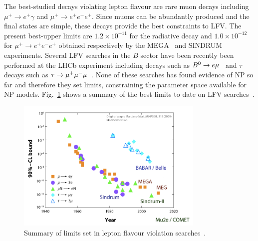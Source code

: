 The best-studied decays violating lepton flavour 
are rare muon decays including $\mu^+\to e^+\gamma$ and $\mu^+\to e^+e^-e^+$.
Since muons can be abundantly produced and the final states are simple,
these decays provide the best constraints to LFV. The present best-upper limits are $1.2 \times 10^{-11}$
for the radiative decay and $1.0 \times 10^{-12}$ for $\mu^+\to e^+e^-e^+$ obtained
respectively by the MEGA~\cite{Ahmed:2001eh} and SINDRUM~\cite{Bellgardt:1987du} experiments.
Several LFV searches in the $B$ sector have been recently been performed at the LHCb experiment 
including decays such as $B^0\rightarrow e\mu$~\cite{LHCB-PAPER-2013-030} and $\tau$ decays such
as $\tau\rightarrow\mu^+\mu^-\mu$~\cite{LHCB-PAPER-2013-014}. None of these searches has found evidence 
of NP so far and therefore they set limits, constraining the parameter space available for NP models.
Fig.~\ref{fig:LFV_decay} shows a summary of the best limits to date on LFV searches~\cite{Marciano:2008zz}.


\begin{figure}[h!]
\label{fig:LFV_decay}
\centering 
\includegraphics[width=0.8\textwidth]{Introduction/figs/LFV.png}
\caption{Summary of limits set in lepton flavour violation searches~\cite{Marciano:2008zz}.}
\end{figure}
 
